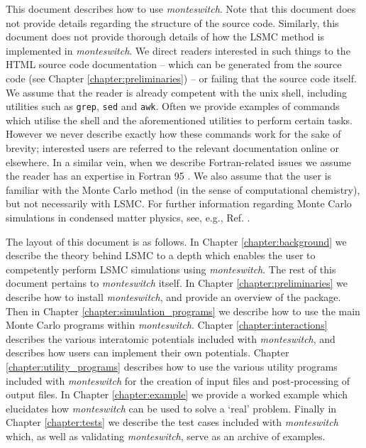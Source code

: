 \documentclass{report}
\begin{document}

This document describes how to use \emph{monteswitch}. Note that this document does not provide details regarding the structure of the source code. 
Similarly, this document does not provide thorough details of how the LSMC method is implemented in \emph{monteswitch}. We direct readers
interested in such things to the HTML source code documentation -- which can be generated from the source code (see Chapter
\ref{chapter:preliminaries}) -- or failing that the source code itself. We assume that the reader is already competent with the unix shell, 
including utilities such as \texttt{grep}, \texttt{sed} and \texttt{awk}. Often we provide examples of commands which utilise the shell and the 
aforementioned utilities to perform certain tasks. However we never describe exactly how these commands work for the sake of brevity; interested users are 
referred to the relevant documentation online or elsewhere. In a similar vein, when we describe Fortran-related issues we assume the reader has 
an expertise in Fortran 95 . We also assume that the user is familiar with the Monte Carlo method (in the sense of computational
chemistry), but not necessarily with LSMC. For further information regarding Monte Carlo simulations in condensed 
matter physics, see, e.g., Ref. \cite{book:Frenkel}. 

The layout of this document is as follows. In Chapter \ref{chapter:background} we describe the theory behind LSMC to a depth which enables the user to 
competently perform LSMC simulations using \emph{monteswitch}. The rest of this document pertains to \emph{monteswitch} itself.
In Chapter \ref{chapter:preliminaries} we describe how to install \emph{monteswitch}, and provide
an overview of the package. Then in Chapter \ref{chapter:simulation_programs} we describe how to use the main Monte Carlo programs within
\emph{monteswitch}. Chapter \ref{chapter:interactions} describes the various interatomic potentials included with \emph{monteswitch}, and
describes how users can implement their own potentials. Chapter \ref{chapter:utility_programs} describes how to use the various utility
programs included with \emph{monteswitch} for the creation of input files and post-processing of output files. In Chapter \ref{chapter:example}
we provide a worked example which elucidates how \emph{monteswitch} can be used to solve a `real' problem. Finally in Chapter \ref{chapter:tests}
we describe the test cases included with \emph{monteswitch} which, as well as validating \emph{monteswitch}, serve as an archive of examples.
\end{document}
